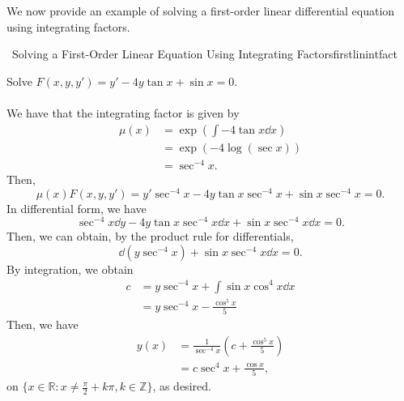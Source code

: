         \vphantom
        \\
        \\
        We now provide an example of solving a first-order linear differential equation using integrating factors.
        \begin{example}{\Difficulty\,\Difficulty\,\,Solving a First-Order Linear Equation Using Integrating Factors}{firstlinintfact}
            
            Solve \(F(x,y,y')=y'-4y\tan x+\sin x=0\).
            \\
            \\
            We have that the integrating factor is given by
            \begin{align*}
                \mu(x)&=\exp\left(\int -4\tan x\dd x\right) \\
                &=\exp(-4\log(\sec x)) \\
                &=\sec^{-4}x.
            \end{align*}
            Then,
            \begin{equation*}
                \mu(x)F(x,y,y')=y'\sec^{-4}x-4y\tan x\sec^{-4}x+\sin x\sec^{-4}x=0. 
            \end{equation*}
            In differential form, we have
            \begin{equation*}
                \sec^{-4}x\dd y-4y\tan x\sec^{-4}x\dd x+\sin x\sec^{-4}x\dd x=0.
            \end{equation*}
            Then, we can obtain, by the product rule for differentials,
            \begin{equation*}
                \dd(y\sec^{-4}x)+\sin x\sec^{-4}x\dd x=0.
            \end{equation*}
            By integration, we obtain
            \begin{align*}
                c&=y\sec^{-4}x+\int \sin x\cos^{4}x\dd x \\
                &=y\sec^{-4}x-\frac{\cos^5x}{5}
            \end{align*}
            Then, we have 
            \begin{align*}
                y(x)&=\frac{1}{\sec^{-4}x}\left(c+\frac{\cos^5x}{5}\right) \\
                &=c\sec^4x+\frac{\cos x}{5},
            \end{align*}
            on \(\{x\in\mathbb{R}:x\neq \frac{\pi}{2}+k\pi, k\in\mathbb{Z}\}\), as desired.
        \end{example}
        \pagebreak

